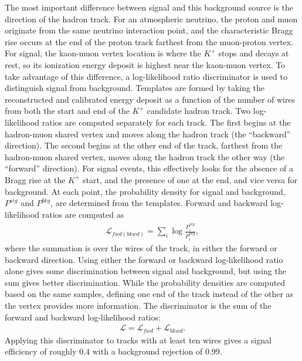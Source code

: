 The most important difference between signal and this background source is the direction of the hadron track. For an atmospheric neutrino, the proton and muon originate from the same neutrino interaction point, and the characteristic Bragg rise occurs at the end of the proton track farthest from the muon-proton vertex. For signal, the kaon-muon vertex location is where the $K^{+}$ stops and decays at rest, so its ionization energy deposit is highest near the kaon-muon vertex.  To take advantage of this difference, a log-likelihood ratio discriminator is used to distinguish signal from background.  Templates are formed by taking the reconstructed and calibrated energy deposit as a function of the number of wires from both the start and end of the $K^{+}$ candidate hadron track. 
Two log-likelihood ratios are computed separately for each track. The first begins at the hadron-muon shared vertex and moves along the hadron track (the ``backward'' direction). The second begins at the other end of the track, farthest from the hadron-muon shared vertex, moves along the hadron track the other way (the ``forward'' direction). For signal events, this effectively looks for the absence of a Bragg rise at the $K^{+}$ start, and the presence of one at the end, and vice versa for background.  At each point, the probability density for signal and background, $P^{sig}$ and $P^{bkg}$, are determined from the templates. Forward and backward log-likelihood ratios are computed as
%
\begin{align}
 \mathcal{L}_{fwd(bkwd)} = \sum_{i} \log\frac{P^{sig}_i}{P^{bkg}_i}, 
\end{align}
where the summation is over the wires of the track, in either the forward or backward direction.  Using either the forward or backward log-likelihood ratio alone gives some discrimination between signal and background, but using the sum gives better discrimination. While the probability densities are computed based on the same samples, defining one end of the track instead of the other as the vertex provides more information. The discriminator is the sum of the forward and backward log-likelihood ratios:
%
\begin{align}
    \mathcal{L} = \mathcal{L}_{fwd} + \mathcal{L}_{bkwd}.\label{eqn:L}
\end{align}
Applying this discriminator to tracks with at least ten wires gives a signal efficiency of roughly \num{0.4} with a background rejection of \num{0.99}.

